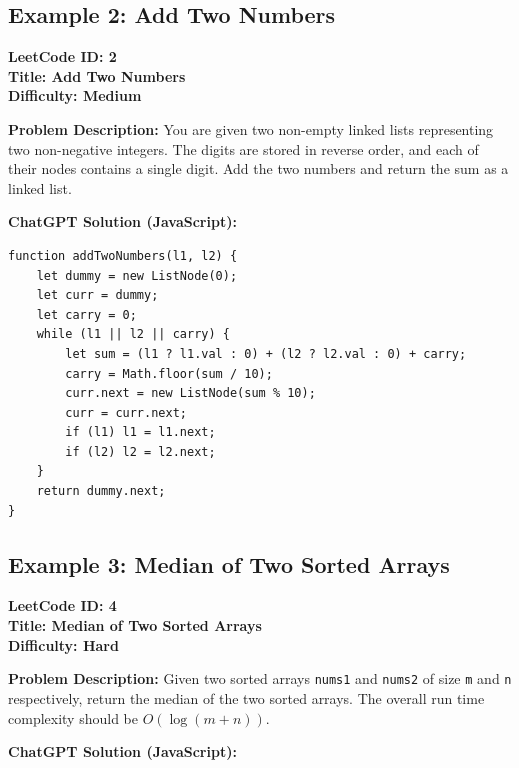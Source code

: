 \documentclass[12pt, a4paper]{article}
\begin{document}
\subsection{Example 2: Add Two Numbers}
\textbf{LeetCode ID: 2} \\
\textbf{Title: Add Two Numbers} \\
\textbf{Difficulty: Medium}

\textbf{Problem Description:}
You are given two non-empty linked lists representing two non-negative integers. The digits are stored in reverse order, and each of their nodes contains a single digit. Add the two numbers and return the sum as a linked list.

\textbf{ChatGPT Solution (JavaScript):}

\begin{verbatim}
function addTwoNumbers(l1, l2) {
    let dummy = new ListNode(0);
    let curr = dummy;
    let carry = 0;
    while (l1 || l2 || carry) {
        let sum = (l1 ? l1.val : 0) + (l2 ? l2.val : 0) + carry;
        carry = Math.floor(sum / 10);
        curr.next = new ListNode(sum % 10);
        curr = curr.next;
        if (l1) l1 = l1.next;
        if (l2) l2 = l2.next;
    }
    return dummy.next;
}
\end{verbatim}

\subsection{Example 3: Median of Two Sorted Arrays}
\textbf{LeetCode ID: 4} \\
\textbf{Title: Median of Two Sorted Arrays} \\
\textbf{Difficulty: Hard}

\textbf{Problem Description:}
Given two sorted arrays \texttt{nums1} and \texttt{nums2} of size \texttt{m} and \texttt{n} respectively, return the median of the two sorted arrays. The overall run time complexity should be $O(\log(m+n))$.

\textbf{ChatGPT Solution (JavaScript):}
\end{document}

